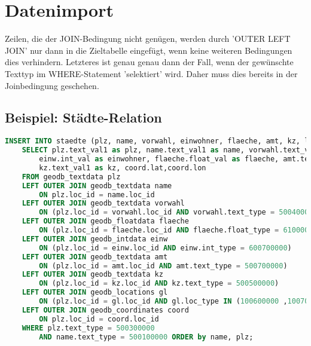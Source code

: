 \documentclass[11pt,a4paper,DIV=10,]{scrartcl}
\begin{document}
\section*{Datenimport}
Zeilen, die der JOIN-Bedingung nicht genügen, werden durch 'OUTER LEFT JOIN' nur dann in die Zieltabelle eingefügt, wenn keine weiteren Bedingungen dies verhindern. Letzteres ist genau  genau dann der Fall, wenn der gewünschte Texttyp im WHERE-Statement 'selektiert' wird. Daher muss dies bereits in der Joinbedingung geschehen.
\subsection*{Beispiel: Städte-Relation}
\begin{lstlisting}[language=sql]
INSERT INTO staedte (plz, name, vorwahl, einwohner, flaeche, amt, kz, lat, lon)
	SELECT plz.text_val1 as plz, name.text_val1 as name, vorwahl.text_val1 as vorwahl,
		einw.int_val as einwohner, flaeche.float_val as flaeche, amt.text_val1 as amt,
		kz.text_val1 as kz, coord.lat,coord.lon
	FROM geodb_textdata plz
	LEFT OUTER JOIN geodb_textdata name 
		ON plz.loc_id = name.loc_id
	LEFT OUTER JOIN geodb_textdata vorwahl 
		ON (plz.loc_id = vorwahl.loc_id AND vorwahl.text_type = 500400000)
	LEFT OUTER JOIN geodb_floatdata flaeche 
		ON (plz.loc_id = flaeche.loc_id AND flaeche.float_type = 610000000)
	LEFT OUTER JOIN geodb_intdata einw 
		ON (plz.loc_id = einw.loc_id AND einw.int_type = 600700000)
	LEFT OUTER JOIN geodb_textdata amt 
		ON (plz.loc_id = amt.loc_id AND amt.text_type = 500700000)
	LEFT OUTER JOIN geodb_textdata kz 
		ON (plz.loc_id = kz.loc_id AND kz.text_type = 500500000)
	LEFT OUTER JOIN geodb_locations gl 
		ON (plz.loc_id = gl.loc_id AND gl.loc_type IN (100600000 ,100700000))
	LEFT OUTER JOIN geodb_coordinates coord 
		ON plz.loc_id = coord.loc_id
	WHERE plz.text_type = 500300000
		AND name.text_type = 500100000 ORDER by name, plz;
\end{lstlisting}
\end{document}
